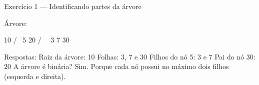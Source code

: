 Exercício 1 — Identificando partes da árvore

Árvore:

        10
       /  \
      5    20
     / \     \
    3   7     30

Respostas:
Raiz da árvore: 10
Folhas: 3, 7 e 30
Filhos do nó 5: 3 e 7
Pai do nó 30: 20
A árvore é binária? Sim. Porque cada nó possui no máximo dois filhos (esquerda e direita).